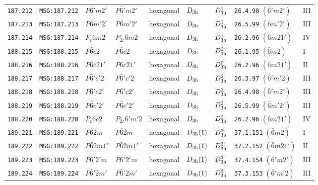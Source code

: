 \documentclass[fleqn,10pt]{jsarticle}
\begin{document}
\begin{center}
\begin{longtable}{lllllllll}
\texttt{187.212} & \texttt{MSG:187.212} & $P\bar{6}'m2'$ & $P\bar{6}'m2'$ & hexagonal & $D_{\rm 3h}$ & $D_{\rm 3h}^{1}$ & \texttt{26.4.98} $(\bar{6}'m2')$ & III \\
\texttt{187.213} & \texttt{MSG:187.213} & $P\bar{6}m'2'$ & $P\bar{6}m'2'$ & hexagonal & $D_{\rm 3h}$ & $D_{\rm 3h}^{1}$ & \texttt{26.5.99} $(\bar{6}m'2')$ & III \\
\texttt{187.214} & \texttt{MSG:187.214} & $P_{c}\bar{6}m2$ & $P_{2c}\bar{6}m2$ & hexagonal & $D_{\rm 3h}$ & $D_{\rm 3h}^{1}$ & \texttt{26.2.96} $(\bar{6}m21')$ & IV \\ \hline
\texttt{188.215} & \texttt{MSG:188.215} & $P\bar{6}c2$ & $P\bar{6}c2$ & hexagonal & $D_{\rm 3h}$ & $D_{\rm 3h}^{2}$ & \texttt{26.1.95} $(\bar{6}m2)$ & I \\
\texttt{188.216} & \texttt{MSG:188.216} & $P\bar{6}c21'$ & $P\bar{6}c21'$ & hexagonal & $D_{\rm 3h}$ & $D_{\rm 3h}^{2}$ & \texttt{26.2.96} $(\bar{6}m21')$ & II \\
\texttt{188.217} & \texttt{MSG:188.217} & $P\bar{6}'c'2$ & $P\bar{6}'c'2$ & hexagonal & $D_{\rm 3h}$ & $D_{\rm 3h}^{2}$ & \texttt{26.3.97} $(\bar{6}'m'2)$ & III \\
\texttt{188.218} & \texttt{MSG:188.218} & $P\bar{6}'c2'$ & $P\bar{6}'c2'$ & hexagonal & $D_{\rm 3h}$ & $D_{\rm 3h}^{2}$ & \texttt{26.4.98} $(\bar{6}'m2')$ & III \\
\texttt{188.219} & \texttt{MSG:188.219} & $P\bar{6}c'2'$ & $P\bar{6}c'2'$ & hexagonal & $D_{\rm 3h}$ & $D_{\rm 3h}^{2}$ & \texttt{26.5.99} $(\bar{6}m'2')$ & III \\
\texttt{188.220} & \texttt{MSG:188.220} & $P_{c}\bar{6}c2$ & $P_{2c}\bar{6}'m'2$ & hexagonal & $D_{\rm 3h}$ & $D_{\rm 3h}^{2}$ & \texttt{26.2.96} $(\bar{6}m21')$ & IV \\ \hline
\texttt{189.221} & \texttt{MSG:189.221} & $P\bar{6}2m$ & $P\bar{6}2m$ & hexagonal & $D_{\rm 3h}(1)$ & $D_{\rm 3h}^{3}$ & \texttt{37.1.151} $(\bar{6}m2)$ & I \\
\texttt{189.222} & \texttt{MSG:189.222} & $P\bar{6}2m1'$ & $P\bar{6}2m1'$ & hexagonal & $D_{\rm 3h}(1)$ & $D_{\rm 3h}^{3}$ & \texttt{37.2.152} $(\bar{6}m21')$ & II \\
\texttt{189.223} & \texttt{MSG:189.223} & $P\bar{6}'2'm$ & $P\bar{6}'2'm$ & hexagonal & $D_{\rm 3h}(1)$ & $D_{\rm 3h}^{3}$ & \texttt{37.4.154} $(\bar{6}'m2')$ & III \\
\texttt{189.224} & \texttt{MSG:189.224} & $P\bar{6}'2m'$ & $P\bar{6}'2m'$ & hexagonal & $D_{\rm 3h}(1)$ & $D_{\rm 3h}^{3}$ & \texttt{37.3.153} $(\bar{6}'m'2)$ & III \\

\end{longtable}
\end{center}
\end{document}
